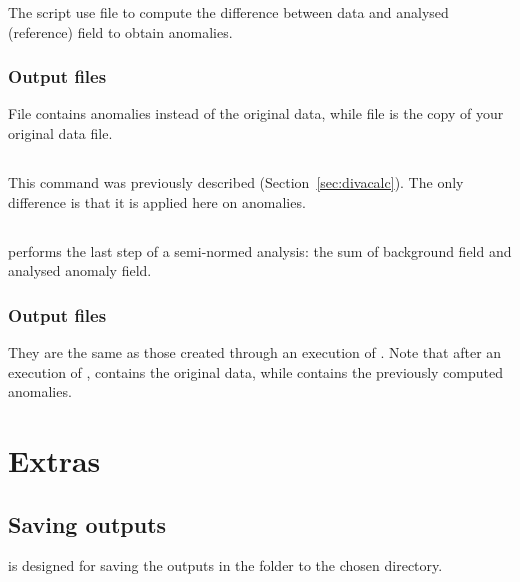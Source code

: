 The script use file  to compute the difference between data and analysed (reference) field to obtain anomalies.

\subsubsection{Output files}

File  contains anomalies instead of the original data, while file  is the copy of your original data file.


\subsection{}

This command was previously described (Section~\ref{sec:divacalc}). The only difference is that it is applied here on anomalies.


\subsection{}

 performs the last step of a semi-normed analysis: the sum of background field and analysed anomaly field. 

\subsubsection{Output files}

They are the same as those created through an execution of . Note that after an execution of ,  contains the original data, while  contains the previously computed anomalies. 



\section{Extras}

\subsection{Saving outputs}

 is designed for saving the outputs in the folder  to the chosen directory.

